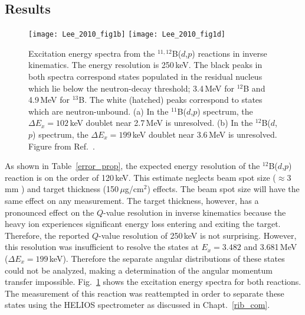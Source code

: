 \subsection{Results}
\begin{figure}%
\centering
{}%
\texttt{[image: Lee\_2010\_fig1b]}
\texttt{[image: Lee\_2010\_fig1d]}
\caption[Excitation energy spectra from the $^{11,12}$B($d$,$p$) reactions in inverse kinematics]{Excitation energy spectra from the $^{11,12}$B($d$,$p$) reactions in inverse kinematics.  The energy resolution is 250\,keV.  The black peaks in both spectra correspond states populated in the residual nucleus which lie below the neutron-decay threshold; 3.4\,MeV for $^{12}$B and 4.9\,MeV for $^{13}$B.  The white (hatched) peaks correspond to states which are neutron-unbound.  (a) In the $^{11}$B($d$,$p$) spectrum, the $\Delta E_x=102$\,keV doublet near 2.7\,MeV is unresolved.  (b) In the $^{12}$B($d$,$p$) spectrum, the $\Delta E_x=199$\,keV doublet near 3.6\,MeV is unresolved.  Figure from Ref.~\cite[Fig.~1]{Lee_2010}.}
\label{b11b12_spec}%
\end{figure}

As shown in Table~\ref{error_prop}, the expected energy resolution of the $^{12}$B($d$,$p$) reaction is on the order of 120\,keV.  This estimate neglects beam spot size ($\approx 3$\,mm ) and target thickness (150\,$\mu$g/cm$^2$) effects. The beam spot size will have the same effect on any measurement.  The target thickness, however, has a pronounced effect on the $Q$-value resolution in inverse kinematics because the heavy ion experiences significant energy loss entering and exiting the target. %
Therefore, the reported $Q$-value resolution of 250\,keV is not surprising.  However, this resolution was insufficient to resolve the states at $E_x=3.482$ and 3.681\,MeV ($\Delta E_x=199$\,keV).  Therefore the separate angular distributions of these states could not be analyzed, making a determination of the angular momentum transfer impossible.  Fig.~\ref{b11b12_spec} shows the excitation energy spectra for both reactions.  The measurement of this reaction was re\-at\-tempt\-ed in order to separate these states using the HELIOS spectrometer as discussed in Chapt.~\ref{rib_com}.

